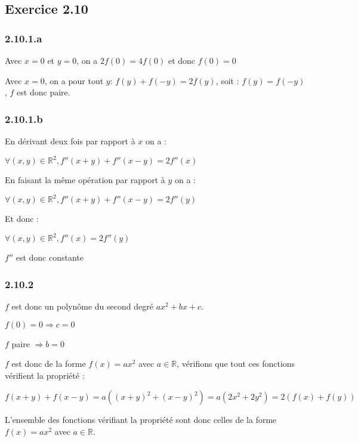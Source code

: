 \documentclass[a4paper,10pt]{report}
\begin{document}
\subsection*{Exercice 2.10}

\subsubsection*{2.10.1.a}

Avec $x=0$ et $y=0$, on a $2f(0) = 4f(0)$ et donc $f(0) = 0$

Avec $x=0$, on a pour tout $y$: $f(y) + f(-y) = 2f(y)$, soit : $f(y)=f(-y)$, $f$ est donc paire.

\subsubsection*{2.10.1.b}

En dérivant deux fois par rapport à $x$ on a :

$\forall (x,y) \in \mathbb{R}^2, f''(x+y) + f''(x-y) = 2f''(x)$

En faisant la même opération par rapport à $y$ on a :

$\forall (x,y) \in \mathbb{R}^2, f''(x+y) + f''(x-y) = 2f''(y)$

Et donc :

$\forall (x,y) \in \mathbb{R}^2, f''(x) = 2f''(y)$

$f''$ est donc constante

\subsubsection*{2.10.2}

$f$ est donc un polynôme du second degré $ax^2 + bx + c$.

$f(0)=0 \Longrightarrow c = 0$

$f$ paire $ \Longrightarrow b = 0$


$f$ est donc de la forme $f(x) = a x^2$ avec $a \in \mathbb{R}$, vérifions que tout ces 
fonctions vérifient la propriété :

$f(x+y) + f(x-y) = a((x+y)^2 +(x-y)^2) = a (2x^2 + 2y^2) = 2(f(x) + f(y))$

L'ensemble des fonctions vérifiant la propriété sont donc celles de la forme $f(x) = a x^2$ avec $a \in \mathbb{R}$.
\end{document}
